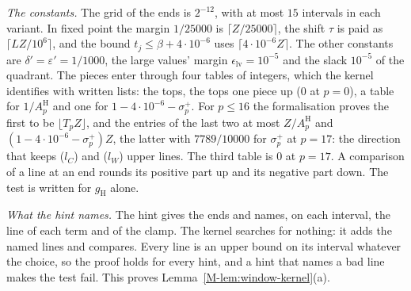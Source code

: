 \documentclass[11pt]{article}
\numberwithin{equation}{section}
\begin{document}
\emph{The constants.} The grid of the ends is $2^{-12}$, with at most $15$ intervals in each variant. In fixed point
the margin $1/25000$ is $\lceil Z/25000 \rceil$, the shift $\tau$ is paid as $\lceil LZ/10^6 \rceil$, and the bound
$t_j \le \beta + 4 \cdot 10^{-6}$ uses $\lceil 4 \cdot 10^{-6} Z \rceil$. The other constants are $\delta' =
\varepsilon' = 1/1000$, the large values' margin $\epsilon_{\mathrm{lv}} = 10^{-5}$ and the slack $10^{-5}$ of the
quadrant. The pieces enter through four tables of integers, which the kernel identifies with written lists: the tops,
the tops one piece up ($0$ at $p = 0$), a table for $1/A^{\mathrm H}_p$ and one for $1 - 4 \cdot 10^{-6} - \sigma^+_p$.
For $p \le 16$ the formalisation proves the first to be $\lfloor T_p Z \rfloor$, and the entries of the last two at
most $Z/A^{\mathrm H}_p$ and $(1 - 4 \cdot 10^{-6} - \sigma^+_p) Z$, the latter with $7789/10000$ for $\sigma^+_p$ at
$p = 17$: the direction that keeps ($l_C$) and ($l_W$) upper lines. The third table is $0$ at $p = 17$. A comparison
of a line at an end rounds its positive part up and its negative part down. The test is written for $g_{\mathrm H}$
alone.

\emph{What the hint names.} The hint gives the ends and names, on each interval, the line of each term and of the
clamp. The kernel searches for nothing: it adds the named lines and compares. Every line is an upper bound on its
interval whatever the choice, so the proof holds for every hint, and a hint that names a bad line makes the test fail.
This proves Lemma~\ref{M-lem:window-kernel}(a).
\end{document}
